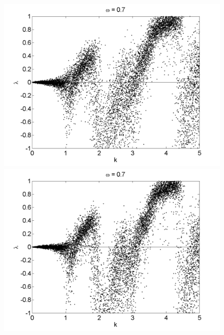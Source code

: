 \begin{figure}[!h]
\includegraphics[width=.5\textwidth]{figs/rcirc_n_lyap_L_05_k_10000.png}\hfill
\includegraphics[width=.5\textwidth]{figs/rcirc_n_lyap_L_07_k_10000.png}\\
\end{figure}